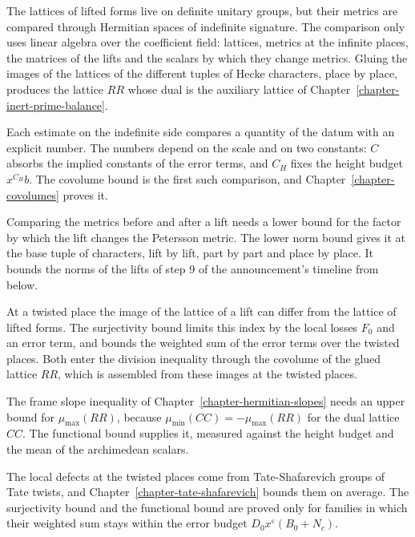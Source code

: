 The lattices of lifted forms live on definite unitary groups, but their metrics are compared through
Hermitian spaces of indefinite signature. The comparison only uses linear algebra over the
coefficient field: lattices, metrics at the infinite places, the matrices of the lifts and the
scalars by which they change metrics. Gluing the images of the lattices of the different tuples of
Hecke characters, place by place, produces the lattice $RR$ whose dual is the auxiliary lattice of
Chapter~\ref{chapter-inert-prime-balance}.

Each estimate on the indefinite side compares a quantity of the datum with an explicit number. The
numbers depend on the scale and on two constants: $C$ absorbs the implied constants of the error
terms, and $C_H$ fixes the height budget $x^{C_H}b$. The covolume bound is the first such
comparison, and Chapter~\ref{chapter-covolumes} proves it.

Comparing the metrics before and after a lift needs a lower bound for the factor by which the lift
changes the Petersson metric. The lower norm bound gives it at the base tuple of characters, lift by
lift, part by part and place by place. It bounds the norms of the lifts of step 9 of the
announcement's timeline from below.

At a twisted place the image of the lattice of a lift can differ from the lattice of lifted forms.
The surjectivity bound limits this index by the local losses $F_0$ and an error term, and bounds the
weighted sum of the error terms over the twisted places. Both enter the division inequality through
the covolume of the glued lattice $RR$, which is assembled from these images at the twisted places.

The frame slope inequality of Chapter~\ref{chapter-hermitian-slopes} needs an upper bound for
$\mu_{\max}(RR)$, because $\mu_{\min}(CC)=-\mu_{\max}(RR)$ for the dual lattice $CC$. The functional
bound supplies it, measured against the height budget and the mean of the archimedean scalars.

The local defects at the twisted places come from Tate-Shafarevich groups of Tate twists, and
Chapter~\ref{chapter-tate-shafarevich} bounds them on average. The surjectivity bound and the
functional bound are proved only for families in which their weighted sum stays within the error
budget $D_0x^{\varepsilon}(B_0+N_c)$.

